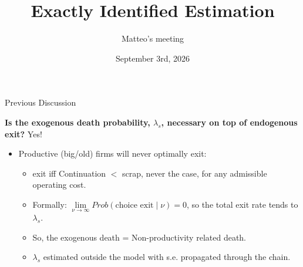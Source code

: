 \documentclass[11pt,aspectratio=169]{beamer}
\title[Exactly Identified Estimation]{
Exactly Identified Estimation}
\author{Matteo's meeting}
\date{September 3rd, 2026}
\begin{document}
 
\begin{frame}
\titlepage
\end{frame}

\begin{frame}{Previous Discussion}

\textbf{Is the exogenous death probability, $\lambda_s$, necessary on top of endogenous exit?} Yes!

\bigskip
\begin{itemize}
    \item Productive (big/old) firms will never optimally exit: 
    \begin{itemize}
    \vspace{2mm}
        \item exit iff Continuation $<$ scrap, never the case, for any admissible operating cost.
        \vspace{2mm}
        \item Formally: $\lim\limits_{\nu\to\infty}Prob(\text{choice exit}\mid \nu) = 0$, so the total exit rate tends to $\lambda_s$.
        \vspace{2mm}
        \item So, the exogenous death = Non-productivity related death. 
        \vspace{2mm}
        \item $\lambda_s$ estimated outside the model with s.e. propagated through the chain. 
        \vspace{2mm}
    \end{itemize}
\end{itemize}

\end{frame}

\end{document}

